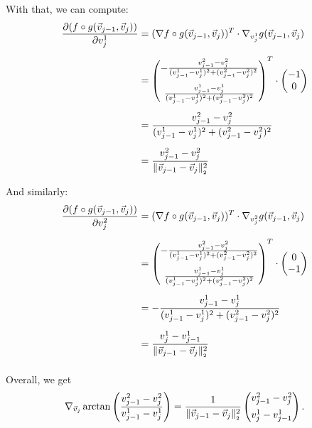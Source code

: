 \begin{proposition}
	With that, we can compute:
	\begin{align*}
		\frac{\partial (f \circ g (\vec{v}_{j-1}, \vec{v}_j))}{\partial v_j^1} &= (\nabla f \circ g (\vec{v}_{j-1}, \vec{v}_j))^T \cdot \nabla_{v_j^1} g (\vec{v}_{j-1}, \vec{v}_j) \\[0.5em]
		&= \begin{pmatrix}
			- \frac{v_{j-1}^2 - v_{j}^2}{(v_{j-1}^1 - v_{j}^1)^2 + (v_{j-1}^2 - v_{j}^2)^2} \\[1.0em]
			\frac{v_{j-1}^1 - v_{j}^1}{(v_{j-1}^1 - v_{j}^1)^2 + (v_{j-1}^2 - v_{j}^2)^2}
		\end{pmatrix}^T
		\cdot 
		\begin{pmatrix}
			-1 \\
			0
		\end{pmatrix} \\[0.5em]
		&= \frac{v_{j-1}^2 - v_{j}^2}{(v_{j-1}^1 - v_{j}^1)^2 + (v_{j-1}^2 - v_{j}^2)^2} \\[0.5em]
		&= \frac{v_{j-1}^2 - v_{j}^2}{\norm[\vec{v}_{j-1} - \vec{v}_j]^2}
	\end{align*}

	And similarly:
	\begin{align*}
		\frac{\partial (f \circ g (\vec{v}_{j-1}, \vec{v}_j))}{\partial v_j^2} &= (\nabla f \circ g (\vec{v}_{j-1}, \vec{v}_j))^T \cdot \nabla_{v_j^2} g (\vec{v}_{j-1}, \vec{v}_j) \\[0.5em]
		&= \begin{pmatrix}
			- \frac{v_{j-1}^2 - v_{j}^2}{(v_{j-1}^1 - v_{j}^1)^2 + (v_{j-1}^2 - v_{j}^2)^2} \\[1.0em]
			\frac{v_{j-1}^1 - v_{j}^1}{(v_{j-1}^1 - v_{j}^1)^2 + (v_{j-1}^2 - v_{j}^2)^2}
		\end{pmatrix}^T
		\cdot 
		\begin{pmatrix}
			0 \\
			-1
		\end{pmatrix} \\[0.5em]
		&= - \frac{v_{j-1}^1 - v_{j}^1}{(v_{j-1}^1 - v_{j}^1)^2 + (v_{j-1}^2 - v_{j}^2)^2} \\[0.5em]
		&= \frac{v_{j}^1 - v_{j-1}^1}{\norm[\vec{v}_{j-1} - \vec{v}_j]^2} \\[0.5em]
	\end{align*}

	Overall, we get 
	\begin{align*}
		\nabla_{\vec{v}_j} \arctan \left(\frac{v_{j-1}^2 - v_{j}^2}{v_{j-1}^1 - v_{j}^1} \right) = \frac{1}{\norm[\vec{v}_{j-1} - \vec{v}_j]^2} \begin{pmatrix}
			v_{j-1}^2 - v_{j}^2 \\[0.5em]
			v_{j}^1 - v_{j-1}^1
		\end{pmatrix}.
	\end{align*}
	

\end{proposition}

